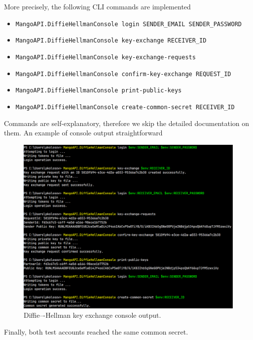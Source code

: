 More precisely, the following CLI commands are implemented
\begin{itemize}
    \item \texttt{MangoAPI.DiffieHellmanConsole login SENDER\_EMAIL SENDER\_PASSWORD}
    \item \texttt{MangoAPI.DiffieHellmanConsole key-exchange RECEIVER\_ID}
    \item \texttt{MangoAPI.DiffieHellmanConsole key-exchange-requests}
    \item \texttt{MangoAPI.DiffieHellmanConsole confirm-key-exchange REQUEST\_ID}
    \item \texttt{MangoAPI.DiffieHellmanConsole print-public-keys}
    \item \texttt{MangoAPI.DiffieHellmanConsole create-common-secret RECEIVER\_ID}
\end{itemize}
Commands are self-explanatory, therefore we skip the detailed documentation on them.
An example of console output straightforward
\begin{figure}[H]
    \centering
    \includegraphics[width=1\textwidth]{Pictures/08_Diffie-Hellman_console_output}
    \caption{Diffie–-Hellman key exchange console output.}\label{fig:figure7}
\end{figure}
Finally, both test accounts reached the same common secret.